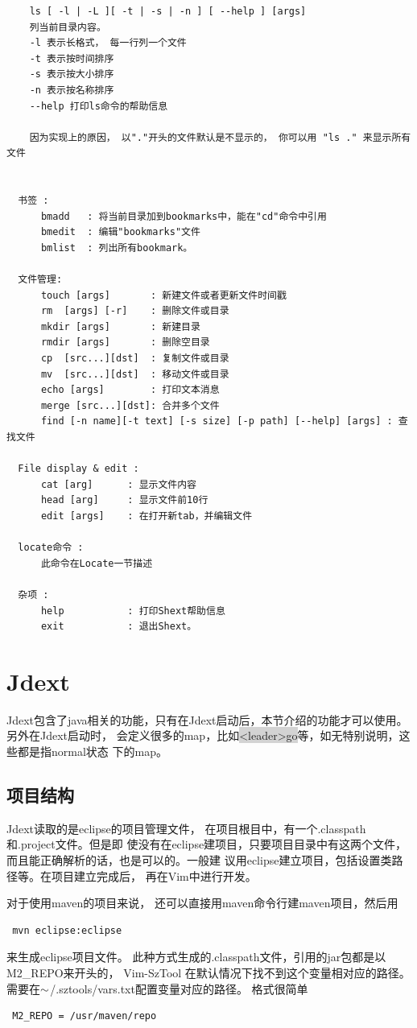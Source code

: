 \documentclass[oneside,openany]{book}
\begin{document}
  \begin{verbatim}
    ls [ -l | -L ][ -t | -s | -n ] [ --help ] [args] 
    列当前目录内容。 
    -l 表示长格式， 每一行列一个文件
    -t 表示按时间排序
    -s 表示按大小排序
    -n 表示按名称排序
    --help 打印ls命令的帮助信息

    因为实现上的原因， 以"."开头的文件默认是不显示的， 你可以用 "ls ." 来显示所有文件


  书签 :
      bmadd   : 将当前目录加到bookmarks中，能在"cd"命令中引用
      bmedit  : 编辑"bookmarks"文件
      bmlist  : 列出所有bookmark。

  文件管理:
      touch [args]       : 新建文件或者更新文件时间戳
      rm  [args] [-r]    : 删除文件或目录
      mkdir [args]       : 新建目录
      rmdir [args]       : 删除空目录
      cp  [src...][dst]  : 复制文件或目录
      mv  [src...][dst]  : 移动文件或目录
      echo [args]        : 打印文本消息
      merge [src...][dst]: 合并多个文件
      find [-n name][-t text] [-s size] [-p path] [--help] [args] : 查找文件

  File display & edit :
      cat [arg]      : 显示文件内容
      head [arg]     : 显示文件前10行
      edit [args]    : 在打开新tab，并编辑文件

  locate命令 :
      此命令在Locate一节描述

  杂项 :
      help           : 打印Shext帮助信息
      exit           : 退出Shext。
  \end{verbatim}

\section{Jdext}
  Jdext包含了java相关的功能，只有在Jdext启动后，本节介绍的功能才可以使用。另外在Jdext启动时，
会定义很多的map，比如\colorbox{lightgray}{<leader>go}等，如无特别说明，这些都是指normal状态
下的map。

\subsection{项目结构}
    Jdext读取的是eclipse的项目管理文件， 在项目根目中，有一个.classpath和.project文件。但是即
使没有在eclipse建项目，只要项目目录中有这两个文件，而且能正确解析的话，也是可以的。一般建
议用eclipse建立项目，包括设置类路径等。在项目建立完成后， 再在Vim中进行开发。

   对于使用maven的项目来说， 还可以直接用maven命令行建maven项目，然后用
  \begin{verbatim} mvn eclipse:eclipse \end{verbatim}
  来生成eclipse项目文件。 此种方式生成的.classpath文件，引用的jar包都是以M2\_REPO来开头的， Vim-SzTool
在默认情况下找不到这个变量相对应的路径。 需要在$\tiny{\sim}$/.sztools/vars.txt配置变量对应的路径。 格式很简单
  \begin{verbatim} M2_REPO = /usr/maven/repo \end{verbatim}
\end{document}
